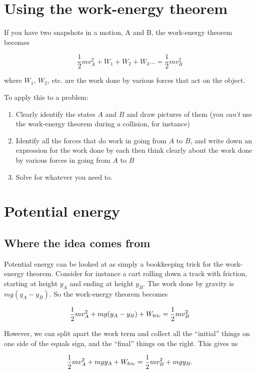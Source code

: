 \documentclass[10pt]{article}
\begin{document}
\section{Using the work-energy theorem}

If you have two snapshots in a motion, A and B, the work-energy theorem becomes

\begin{equation}
\frac{1}{2}mv_A^2 + W_1 + W_2 + W_3... = \frac{1}{2}mv_B^2
\end{equation}

where $W_1$, $W_2$, etc. are the work done by various forces that act on the object.

To apply this to a problem:

\begin{enumerate}
	\item Clearly identify the states $A$ and $B$ and draw pictures of them (you {\it can't} use the work-energy theorem during a collision, for instance)
	\item Identify all the forces that do work in going from $A$ to $B$, and write down an expression for the work done by each then think clearly about the work done by various forces in going from $A$ to $B$
	\item Solve for whatever you need to.
\end{enumerate}

\section {Potential energy}

\subsection{Where the idea comes from}

Potential energy can be looked at as simply a bookkeeping trick for the work-energy theorem. Consider for instance a cart rolling down a track with friction, starting at height $y_A$ and ending at height $y_B$. The work done by gravity is $mg(y_A - y_B)$. So the work-energy theorem becomes

$$\frac{1}{2}mv_A^2 + mg(y_A - y_B) + W_{\rm fric} = \frac{1}{2}mv_B^2$$

However, we can split apart the work term and collect all the ``initial'' things on one side of the equals sign, and the ``final'' things on the right. This gives us

$$\frac{1}{2}mv_A^2 + mgy_A + W_{\rm fric} = \frac{1}{2}mv_B^2 + mgy_B.$$
\end{document}
